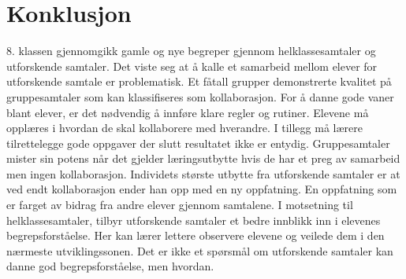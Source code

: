 \documentclass[main.tex]{subfiles}
\begin{document}
\section*{Konklusjon}
\label{sec:4}

8. klassen gjennomgikk gamle og nye begreper gjennom helklassesamtaler og utforskende 
samtaler. Det viste seg at å kalle et samarbeid mellom elever for utforskende samtale
er problematisk. Et fåtall grupper demonstrerte kvalitet på gruppesamtaler som kan
klassifiseres som kollaborasjon. For å danne gode vaner blant elever, er det nødvendig 
å innføre klare regler og rutiner. Elevene må opplæres i hvordan de skal kollaborere 
med hverandre. I tillegg må lærere tilrettelegge gode oppgaver der slutt resultatet 
ikke er entydig. Gruppesamtaler mister sin potens når det gjelder læringsutbytte hvis 
de har et preg av samarbeid men ingen kollaborasjon. Individets største utbytte fra 
utforskende samtaler er at ved endt kollaborasjon ender han opp med en ny oppfatning. 
En oppfatning som er farget av bidrag fra andre elever gjennom samtalene.
I motsetning til helklassesamtaler, tilbyr utforskende samtaler et bedre innblikk
inn i elevenes begrepsforståelse. Her kan lærer lettere observere elevene og veilede
dem i den nærmeste utviklingssonen.
\newline
\newline
Det er ikke et spørsmål om utforskende samtaler kan danne god begrepsforståelse, men 
hvordan.
\end{document}
